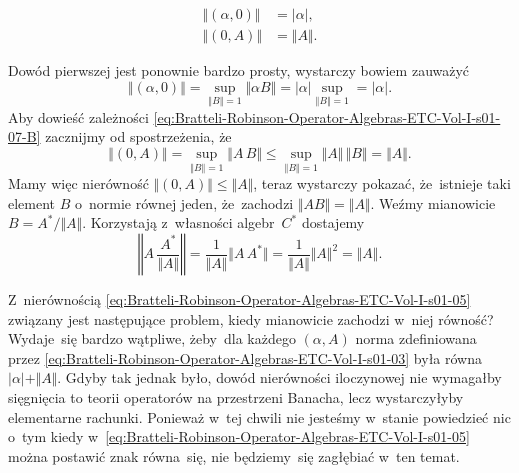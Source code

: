 \documentclass[a4paper,11pt]{article}
\begin{document}
\negVerSpaceFour


\begin{subequations}

  \begin{align}
    \label{eq:Bratteli-Robinson-Operator-Algebras-ETC-Vol-I-s01-07-A}
    \Vert ( \alpha, 0 ) \Vert &= | \alpha |, \\
    \label{eq:Bratteli-Robinson-Operator-Algebras-ETC-Vol-I-s01-07-B}
    \Vert ( 0, A ) \Vert &= \Vert A \Vert.
  \end{align}

\end{subequations}

\noindent
Dowód pierwszej jest ponownie bardzo prosty, wystarczy bowiem zauważyć
\begin{equation}
  \label{eq:Bratteli-Robinson-Operator-Algebras-ETC-Vol-I-s01-08}
  \Vert ( \alpha, 0 ) \Vert =
  \sup_{ \Vert B \Vert = 1 } \Vert \alpha B \Vert =
  | \alpha | \sup_{ \Vert B \Vert = 1 } = | \alpha |.
\end{equation}
Aby dowieść zależności
\eqref{eq:Bratteli-Robinson-Operator-Algebras-ETC-Vol-I-s01-07-B} zacznijmy
od spostrzeżenia, że
\begin{equation}
  \label{eq:Bratteli-Robinson-Operator-Algebras-ETC-Vol-I-s01-09}
  \Vert ( 0, A ) \Vert =
  \sup_{ \Vert B \Vert = 1 } \Vert A \, B \Vert \leq
  \sup_{ \Vert B \Vert = 1 } \Vert A \Vert \, \Vert B \Vert = \Vert A \Vert.
\end{equation}
Mamy więc nierówność $\Vert ( 0, A ) \Vert \leq \Vert A \Vert$, teraz wystarczy pokazać,
że~istnieje taki element $B$ o~normie równej jeden, że~zachodzi
$\Vert A B \Vert = \Vert A \Vert$. Weźmy mianowicie $B = A^{ * } / \Vert A \Vert$. Korzystają
z~własności algebr~$C^{ * }$ dostajemy
\begin{equation}
  \label{eq:Bratteli-Robinson-Operator-Algebras-ETC-Vol-I-s01-10}
  \left\Vert A \, \frac{ A^{ * } }{ \Vert A \Vert } \right\Vert =
  \frac{ 1 }{ \Vert A \Vert } \Vert A \, A^{ * } \Vert =
  \frac{ 1 }{ \Vert A \Vert } \Vert A \Vert^{ 2 } = \Vert A \Vert.
\end{equation}

Z~nierównością
\eqref{eq:Bratteli-Robinson-Operator-Algebras-ETC-Vol-I-s01-05} związany
jest następujące problem, kiedy mianowicie zachodzi w~niej równość?
Wydaje~się bardzo wątpliwe, żeby~dla każdego $( \alpha, A )$ norma zdefiniowana
przez \eqref{eq:Bratteli-Robinson-Operator-Algebras-ETC-Vol-I-s01-03} była
równa $| \alpha | + \Vert A \Vert$. Gdyby tak jednak było, dowód nierówności iloczynowej
nie wymagałby sięgnięcia to teorii operatorów na przestrzeni Banacha, lecz
wystarczyłyby elementarne rachunki. Ponieważ w~tej chwili nie jesteśmy
w~stanie powiedzieć nic o~tym kiedy
w~\eqref{eq:Bratteli-Robinson-Operator-Algebras-ETC-Vol-I-s01-05} można
postawić znak równa~się, nie będziemy~się zagłębiać w~ten temat.
\end{document}
